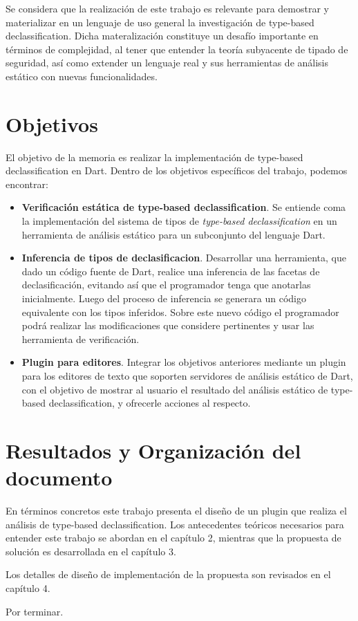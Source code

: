 \begin{intro}
	Se considera que la realización de este trabajo es relevante para demostrar y materializar en un lenguaje de uso general la investigación de type-based declassification. Dicha materalización constituye un desafío importante en términos de complejidad, al tener que entender la teoría subyacente de tipado de seguridad, así como extender un lenguaje real y sus herramientas de análisis estático con nuevas funcionalidades.

		\section{Objetivos}
	El objetivo de la memoria es realizar la implementación de type-based declassification en Dart. Dentro de los objetivos específicos del trabajo, podemos encontrar:

	\begin{itemize}
	\item \textbf{Verificación estática de type-based declassification}. Se entiende coma la implementación del sistema de tipos de \textit{type-based declassification} en un herramienta de análisis estático para un subconjunto del lenguaje Dart.

	\item \textbf{Inferencia de tipos de declasificacion}. Desarrollar una herramienta, que dado un código fuente de Dart, realice una inferencia de las facetas de declasificación, evitando así que el programador tenga que anotarlas inicialmente. Luego del proceso de inferencia se generara un código equivalente con los tipos inferidos. Sobre este nuevo código el programador podrá realizar las modificaciones que considere pertinentes y usar las herramienta de verificación.

	\item \textbf{Plugin para editores}. Integrar los objetivos anteriores mediante un plugin para los editores de texto que soporten servidores de análisis estático de Dart, con el objetivo de mostrar al usuario el resultado del análisis estático de type-based declassification, y ofrecerle acciones al respecto.

	\end{itemize}

		\section{Resultados y Organización del documento}

	En términos concretos este trabajo presenta el diseño de un plugin que realiza el análisis de type-based declassification. Los antecedentes teóricos necesarios para entender este trabajo se abordan en el capítulo 2, mientras que la propuesta de solución es desarrollada en el capítulo 3.

	Los detalles de diseño de implementación de la propuesta son revisados en el capítulo 4.

	Por terminar.


\end{intro}
